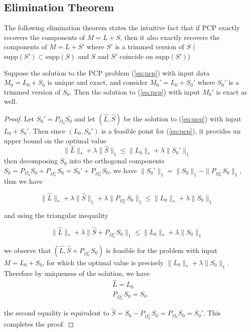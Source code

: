 \subsection{Elimination Theorem}
The following elimination theorem states the intuitive fact that if PCP exactly recovers the components of $M = L+S$, then it also exactly recovers the components of $M = L+S'$ where $S'$ is a trimmed version of $S$ ($\text{supp}(S')\subset \text{supp}(S)$ and $S$ and $S'$ coincide on $\text{supp}(S')$)

\begin{theorem}
Suppose the solution to the PCP problem (\ref{eq:pcp}) with input data $M_0 = L_0 + S_0$ is unique and exact, and consider $M_0' = L_0 + S_0'$ where $S_0'$ is a trimmed version of $S_0$. Then the solution to (\ref{eq:pcp}) with input $M_0'$ is exact as well.
\end{theorem}

\begin{proof}
Let $S_0' = P_{\Omega_0} S_0$ and let $(\hat{L}, \hat{S})$ be the solution to (\ref{eq:pcp}) with input $L_0 + S_0'$. Then since $(L_0, S_0')$ is a feasible point for (\ref{eq:pcp}), it provides un upper bound on the optimal value
\[
\|\hat{L}\|_* + \lambda \|\hat{S}\|_1 \leq \|L_0\|_* + \lambda \|S_0'\|_1
\]
then decomposing $S_0$ into the orthogonal components $S_0 = P_{\Omega_0} S_0 + P_{\Omega_0^\perp} S_0 = S_0' + P_{\Omega_0^\perp} S_0$, we have $\|S_0'\|_1 = \|S_0\|_1 - \|P_{\Omega_0^\perp} S_0\|_1$, thus we have

\[
\|\hat{L}\|_* + \lambda \|\hat{S}\|_1 + \lambda \|P_{\Omega_0^\perp} S_0\|_1 \leq \|L_0\|_* + \lambda \|S_0\|_1
\]

and using the triangular inequality

\[
\|\hat{L}\|_* + \lambda \|\hat{S} + P_{\Omega_0^\perp} S_0\|_1 \leq \|L_0\|_* + \lambda \|S_0\|_1
\]

we observe that $(\hat{L}, \hat{S} + P_{\Omega_0^\perp} S_0)$ is feasible for the problem with input $M = L_0 + S_0$, for which the optimal value is precisely $\|L_0\|_* + \lambda \|S_0\|_1$. Therefore by uniqueness of the solution, we have
\[
\begin{aligned}
&\hat{L} = L_0 \\
&P_{\Omega_0^\perp} S_0 = S_0
\end{aligned}
\]

the second equality is equivalent to $\hat{S} = S_0 - P_{\Omega_0^\perp} S_0 = P_{\Omega_0} S_0 = S_0'$. This completes the proof.
\end{proof}


